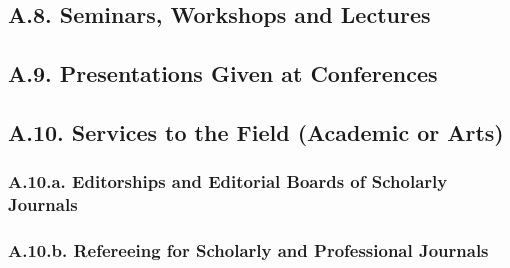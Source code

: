 \documentclass[12pt]{article}
\begin{document}

\subsection*{A.8. Seminars, Workshops and Lectures}


\subsection*{A.9. Presentations Given at Conferences}


\subsection*{A.10. Services to the Field (Academic or Arts)}

\subsubsection*{A.10.a. Editorships and Editorial Boards of Scholarly Journals}


\subsubsection*{A.10.b. Refereeing for Scholarly and Professional Journals}
\end{document}
